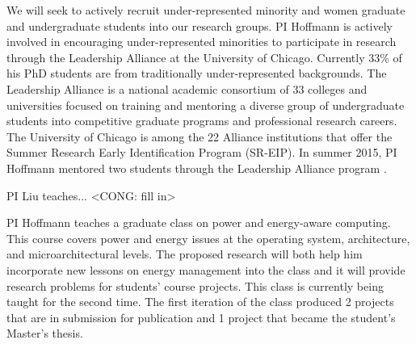 We will seek to actively recruit under-represented minority and women
graduate and undergraduate students into our research groups.  PI
Hoffmann is actively involved in encouraging under-represented
minorities to participate in research through the Leadership Alliance
at the University of Chicago.  Currently 33\% of his PhD students are
from traditionally under-represented backgrounds.  The Leadership
Alliance is a national academic consortium of 33 colleges and
universities focused on training and mentoring a diverse group of
undergraduate students into competitive graduate programs and
professional research careers.  The University of Chicago is among the
22 Alliance institutions that offer the Summer Research Early
Identification Program (SR-EIP). In summer 2015, PI Hoffmann mentored
two students through the Leadership Alliance program
\cite{LA-article}.


\vspace{0.1cm}
PI Liu teaches... <CONG: fill in>

PI Hoffmann teaches a graduate class on power and energy-aware
computing.  This course covers power and energy issues at the
operating system, architecture, and microarchitectural levels. The
proposed research will both help him incorporate new lessons on energy
management into the class and it will provide research problems for
students' course projects.  This class is currently being taught for
the second time. The first iteration of the class produced 2 projects
that are in submission for publication and 1 project that became the
student's Master's thesis.
